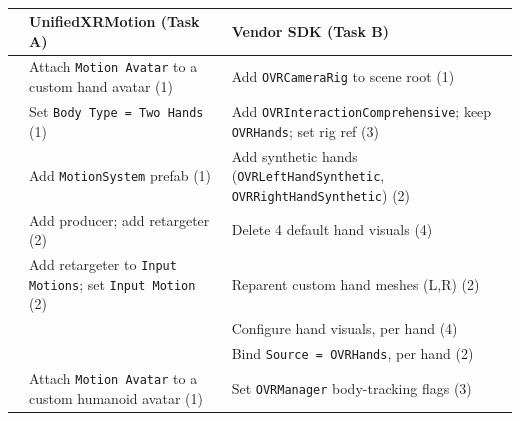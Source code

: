 \begin{table}[t]
	\caption{}
	\label{tab:task-analysis-detail}
	\centering
	\scriptsize
	\setlength{\tabcolsep}{4pt}
	\renewcommand{\arraystretch}{1.1}
	\begin{tabularx}{\textwidth}{@{}c X X@{}}
		\toprule
		 & UnifiedXRMotion (Task A) & Vendor SDK (Task B) \\
		\midrule
		\multirow{7}{*}{\rotatebox{90}{\textbf{Hands}}}
		 & Attach \texttt{Motion\,Avatar} to a custom hand avatar \hfill(1)               & Add \texttt{OVRCameraRig} to scene root \hfill(1) \\
		 & Set \texttt{Body\,Type\,=\,Two\,Hands} \hfill(1)                               & Add \texttt{OVRInteractionComprehensive}; keep \texttt{OVRHands}; set rig ref \hfill(3) \\
		 & Add \texttt{MotionSystem} prefab \hfill(1)                                     & Add synthetic hands (\texttt{OVRLeftHandSynthetic}, \texttt{OVRRightHandSynthetic}) \hfill(2) \\
		 & Add producer; add retargeter \hfill(2)                                         & Delete 4 default hand visuals \hfill(4) \\
		 & Add retargeter to \texttt{Input\,Motions}; set \texttt{Input\,Motion} \hfill(2)& Reparent custom hand meshes (L,R) \hfill(2) \\
		 &                                                                                & Configure hand visuals, per hand \hfill(4) \\
		 &                                                                                & Bind \texttt{Source\,=\,OVRHands}, per hand \hfill(2) \\
		\midrule
		\multirow{5}{*}{\rotatebox{90}{\textbf{\,Body}}}
		 & Attach \texttt{Motion\,Avatar} to a custom humanoid avatar \hfill(1)           & Set \texttt{OVRManager} body-tracking flags \hfill(3) \\

\end{tabularx}
\end{table}

